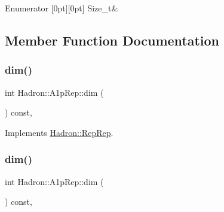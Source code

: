 \begin{DoxyEnumFields}{Enumerator}
[0pt][0pt]{}\mbox{\label{structHadron_1_1A1pRep_a27719f0ee2c616489d39c905c0733e1aa159086896626ac9045fc5cda95283a1a}} 
Size\+\_\+t&\\
\hline

\end{DoxyEnumFields}


\subsection{Member Function Documentation}
\mbox{\label{structHadron_1_1A1pRep_a79006cfd063396120fffa57b1280949e}} 
\subsubsection{\texorpdfstring{dim()}{dim()}\hspace{0.1cm}{\footnotesize\ttfamily [1/3]}}
{\footnotesize\ttfamily int Hadron\+::\+A1p\+Rep\+::dim (\begin{DoxyParamCaption}{ }\end{DoxyParamCaption}) const\hspace{0.3cm}{\ttfamily [inline]}, {\ttfamily [virtual]}}



Implements \mbox{\hyperlink{structHadron_1_1RepRep_a92c8802e5ed7afd7da43ccfd5b7cd92b}{Hadron\+::\+Rep\+Rep}}.

\mbox{\label{structHadron_1_1A1pRep_a79006cfd063396120fffa57b1280949e}} 
\subsubsection{\texorpdfstring{dim()}{dim()}\hspace{0.1cm}{\footnotesize\ttfamily [2/3]}}
{\footnotesize\ttfamily int Hadron\+::\+A1p\+Rep\+::dim (\begin{DoxyParamCaption}{ }\end{DoxyParamCaption}) const\hspace{0.3cm}{\ttfamily [inline]}, {\ttfamily [virtual]}}



